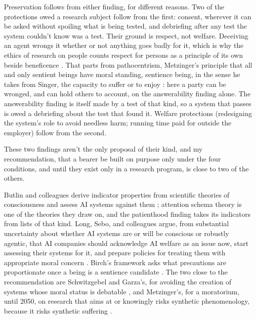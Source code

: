 Preservation follows from either finding, for different reasons. Two of the protections owed a research subject follow from the first: consent, wherever it can be asked without spoiling what is being tested, and debriefing after any test the system couldn't know was a test. Their ground is respect, not welfare. Deceiving an agent wrongs it whether or not anything goes badly for it, which is why the ethics of research on people counts respect for persons as a principle of its own beside beneficence \autocite{belmont1979}. That parts from pathocentrism, Metzinger's principle that all and only sentient beings have moral standing, sentience being, in the sense he takes from Singer, the capacity to suffer or to enjoy \autocite{metzinger2021suffering}: here a party can be wronged, and can hold others to account, on the answerability finding alone. The answerability finding is itself made by a test of that kind, so a system that passes is owed a debriefing about the test that found it. Welfare protections (redesigning the system's role to avoid needless harm; running time paid for outside the employer) follow from the second.

These two findings aren't the only proposal of their kind, and my recommendation, that a bearer be built on purpose only under the four conditions, and until they exist only in a research program, is close to two of the others.

Butlin and colleagues derive indicator properties from scientific theories of consciousness and assess AI systems against them \autocite{butlin2023consciousness}; attention schema theory is one of the theories they draw on, and the patienthood finding takes its indicators from lists of that kind. Long, Sebo, and colleagues argue, from substantial uncertainty about whether AI systems are or will be conscious or robustly agentic, that AI companies should acknowledge AI welfare as an issue now, start assessing their systems for it, and prepare policies for treating them with appropriate moral concern \autocite{long2024taking}. Birch's framework asks what precautions are proportionate once a being is a sentience candidate \autocite{birch2024edge}. The two close to the recommendation are Schwitzgebel and Garza's, for avoiding the creation of systems whose moral status is debatable \autocite{schwitzgebel2015defense}, and Metzinger's, for a moratorium, until 2050, on research that aims at or knowingly risks synthetic phenomenology, because it risks synthetic suffering \autocite{metzinger2021suffering}.


